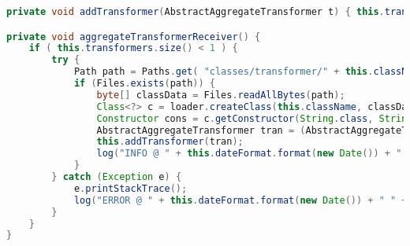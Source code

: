 \begin{lstlisting}[language=Java, label=atr, caption={Metoden \emph{addTransformer}, og metoden \emph{aggregateTransformerReceiver}, som kjøres i en separat tråd idet \textbf{Migrator}-konstruktøren kalles.}]
private void addTransformer(AbstractAggregateTransformer t) { this.transformers.put(t.getAppVersion(), t); }

private void aggregateTransformerReceiver() {
    if ( this.transformers.size() < 1 ) {
        try {
            Path path = Paths.get( "classes/transformer/" + this.className.replace(".","/") + ".class").toAbsolutePath();
            if (Files.exists(path)) {
                byte[] classData = Files.readAllBytes(path);
                Class<?> c = loader.createClass(this.className, classData);
                Constructor cons = c.getConstructor(String.class, String.class);
                AbstractAggregateTransformer tran = (AbstractAggregateTransformer) cons.newInstance( "x", "y" );
                this.addTransformer(tran);
                log("INFO @ " + this.dateFormat.format(new Date()) + " - Received aggregate transformer for schema " + tran.getAppVersion() + "\n");
            }
        } catch (Exception e) {
            e.printStackTrace();
            log("ERROR @ " + this.dateFormat.format(new Date()) + " " + e.toString() + "\n");
        }
    }
}
\end{lstlisting}
